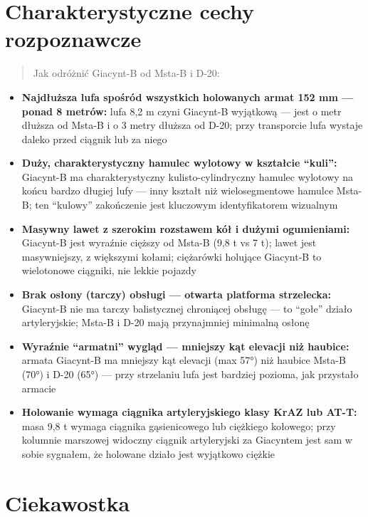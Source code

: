 \documentclass[12pt,openany,oneside]{book}
\providecommand{\tightlist}{%
  \setlength{\itemsep}{0pt}\setlength{\parskip}{0pt}}
\begin{document}
\section{Charakterystyczne cechy
rozpoznawcze}\label{charakterystyczne-cechy-rozpoznawcze-22}

\begin{quote}
Jak odróżnić Giacynt-B od Msta-B i D-20:
\end{quote}

\begin{itemize}
\tightlist
\item
  \textbf{Najdłuższa lufa spośród wszystkich holowanych armat 152 mm ---
  ponad 8 metrów:} lufa 8,2 m czyni Giacynt-B wyjątkową --- jest o metr
  dłuższa od Msta-B i o 3 metry dłuższa od D-20; przy transporcie lufa
  wystaje daleko przed ciągnik lub za niego
\item
  \textbf{Duży, charakterystyczny hamulec wylotowy w kształcie
  ``kuli'':} Giacynt-B ma charakterystyczny kulisto-cylindryczny hamulec
  wylotowy na końcu bardzo długiej lufy --- inny kształt niż
  wielosegmentowe hamulce Msta-B; ten ``kulowy'' zakończenie jest
  kluczowym identyfikatorem wizualnym
\item
  \textbf{Masywny lawet z szerokim rozstawem kół i dużymi ogumieniami:}
  Giacynt-B jest wyraźnie cięższy od Msta-B (9,8 t vs 7 t); lawet jest
  masywniejszy, z większymi kołami; ciężarówki holujące Giacynt-B to
  wielotonowe ciągniki, nie lekkie pojazdy
\item
  \textbf{Brak osłony (tarczy) obsługi --- otwarta platforma
  strzelecka:} Giacynt-B nie ma tarczy balistycznej chroniącej obsługę
  --- to ``gołe'' działo artyleryjskie; Msta-B i D-20 mają przynajmniej
  minimalną osłonę
\item
  \textbf{Wyraźnie ``armatni'' wygląd --- mniejszy kąt elevacji niż
  haubice:} armata Giacynt-B ma mniejszy kąt elevacji (max 57°) niż
  haubice Msta-B (70°) i D-20 (65°) --- przy strzelaniu lufa jest
  bardziej pozioma, jak przystało armacie
\item
  \textbf{Holowanie wymaga ciągnika artyleryjskiego klasy KrAZ lub
  AT-T:} masa 9,8 t wymaga ciągnika gąsienicowego lub ciężkiego
  kołowego; przy kolumnie marszowej widoczny ciągnik artyleryjski za
  Giacyntem jest sam w sobie sygnałem, że holowane działo jest wyjątkowo
  ciężkie
\end{itemize}

\section{Ciekawostka}\label{ciekawostka-22}
\end{document}
